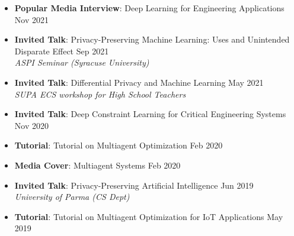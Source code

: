 \begin{itemize}
  \item {\bf Popular Media Interview}: {Deep Learning for Engineering Applications} \hfill {Nov 2021}\\ 

  \item \textbf{Invited Talk}: Privacy-Preserving Machine Learning: Uses and Unintended Disparate Effect \hfill Sep 2021\\
  {\em ASPI Seminar (Syracuse University)} 
  
  \item \textbf{Invited Talk}: Differential Privacy and Machine Learning \hfill May 2021\\
  {\em SUPA ECS workshop for High School Teachers}
  

  \item {\bf Invited Talk}: Deep Constraint Learning for Critical Engineering Systems \hfill {Nov 2020}\\
  
  \item {\bf Tutorial}: {Tutorial on Multiagent Optimization} \hfill {Feb 2020}\\ 
  
  \item {\bf Media Cover}: {Multiagent Systems} \hfill{Feb 2020}\\

  \item {\bf Invited Talk}:  Privacy-Preserving Artificial Intelligence \hfill {Jun 2019}\\
  {\em University of Parma (CS Dept)} 

  \item {\bf Tutorial}: {Tutorial on Multiagent Optimization for IoT Applications} \hfill {May 2019}\\ 


\end{itemize}
